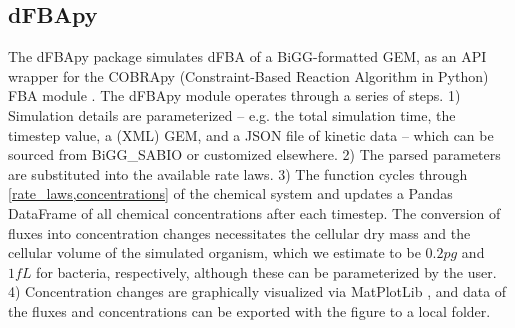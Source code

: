 \subsection{dFBApy}
The dFBApy package simulates dFBA of a BiGG-formatted GEM, as an API wrapper for the COBRApy (Constraint-Based Reaction Algorithm in Python) FBA module \cite{Schellenberger2011QuantitativeV2.0,Lloyd2018COBRAme:Expression}. The dFBApy module operates through a series of steps. 1) Simulation details are parameterized -- e.g. the total simulation time, the timestep value, a (XML) GEM, and a JSON file of kinetic data -- which can be sourced from BiGG\_SABIO or customized elsewhere. 2) The parsed parameters are substituted into the available rate laws. 3) The  function cycles through \cref{rate_laws,concentrations} of the chemical system and updates a Pandas DataFrame \cite{McKinney2011Pandas:Statistics} of all chemical concentrations after each timestep. The conversion of fluxes into concentration changes necessitates the cellular dry mass and the cellular volume of the simulated organism, which we estimate to be $0.2 pg$ \cite{Loferer-Krobacher1998DeterminationAnalysis} and $1 fL$ \cite{Lewis2014MassPopulations} for bacteria, respectively, although these can be parameterized by the user. 4) Concentration changes are graphically visualized via MatPlotLib \cite{Hunter2007Matplotlib:Environment}, and data of the fluxes and concentrations can be exported with the figure to a local folder. 

